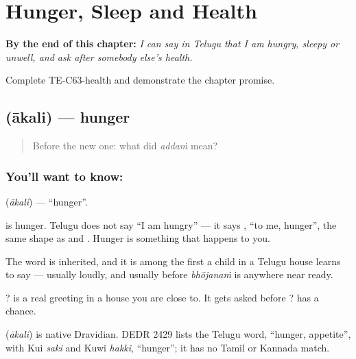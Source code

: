 
\chapter{Hunger, Sleep and Health}
\label{ch:te-health}

\begin{chapteropening}
\textbf{By the end of this chapter:} \emph{I can say in Telugu that I am hungry, sleepy or unwell, and ask after somebody else's health.}

Complete TE-C63-health and demonstrate the chapter promise.
\end{chapteropening}

\section[\texorpdfstring{\te{ఆకలి} (ākali)}{ఆకలి (ākali)}]{ (ākali) — hunger}

\label{lesson:TE-C63-hunger}



\begin{quote}
Before the new one: what did \emph{addaṁ} mean?
\end{quote}

\subsection*{You'll want to know: }
\textbf{} (\emph{ākali}) — \textquotedblleft{}hunger\textquotedblright{}.

 is hunger. Telugu does not say \textquotedblleft{}I am hungry\textquotedblright{} — it says  , \textquotedblleft{}to me, hunger\textquotedblright{}, the same shape as   and   . Hunger is something that happens to you.

The word is inherited, and it is among the first a child in a Telugu house learns to say — usually loudly, and usually before \emph{bhōjanaṁ} is anywhere near ready.

 ? is a real greeting in a house you are close to. It gets asked before   ? has a chance.

\begin{cousinweb}
\textbf{} (\emph{ākali}) is native Dravidian. DEDR 2429 lists the Telugu word, \textquotedblleft{}hunger, appetite\textquotedblright{}, with Kui \emph{saki} and Kuwi \emph{hakki}, \textquotedblleft{}hunger\textquotedblright{}; it has no Tamil or Kannada match.
\end{cousinweb}

